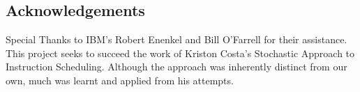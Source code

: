 \documentclass[a0,landscape,24pt]{a0poster}
\begin{document}
\begin{multicols}{3}
\section*{Acknowledgements}

Special Thanks to IBM's Robert Enenkel and Bill O'Farrell for their assistance. This project seeks to succeed the work of Kriston Costa's Stochastic Approach to Instruction Scheduling. Although the approach was inherently distinct from our own, much was learnt and applied from his attempts.


\end{multicols}
\end{document}
